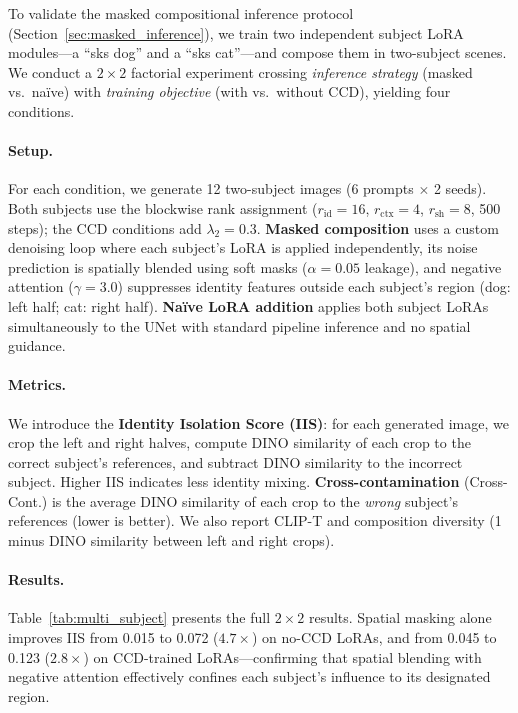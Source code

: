 \documentclass{article}
\begin{document}
To validate the masked compositional inference protocol (Section~\ref{sec:masked_inference}), we train two independent subject LoRA modules---a ``sks dog'' and a ``sks cat''---and compose them in two-subject scenes.
We conduct a $2 \times 2$ factorial experiment crossing \emph{inference strategy} (masked vs.\ na\"ive) with \emph{training objective} (with vs.\ without CCD), yielding four conditions.

\paragraph{Setup.}
For each condition, we generate 12 two-subject images (6 prompts $\times$ 2 seeds).
Both subjects use the blockwise rank assignment ($r_{\text{id}}{=}16$, $r_{\text{ctx}}{=}4$, $r_{\text{sh}}{=}8$, 500 steps); the CCD conditions add $\lambda_2{=}0.3$.
\textbf{Masked composition} uses a custom denoising loop where each subject's LoRA is applied independently, its noise prediction is spatially blended using soft masks ($\alpha{=}0.05$ leakage), and negative attention ($\gamma{=}3.0$) suppresses identity features outside each subject's region (dog: left half; cat: right half).
\textbf{Na\"ive LoRA addition} applies both subject LoRAs simultaneously to the UNet with standard pipeline inference and no spatial guidance.

\paragraph{Metrics.}
We introduce the \textbf{Identity Isolation Score (IIS)}: for each generated image, we crop the left and right halves, compute DINO similarity of each crop to the correct subject's references, and subtract DINO similarity to the incorrect subject.
Higher IIS indicates less identity mixing.
\textbf{Cross-contamination} (Cross-Cont.) is the average DINO similarity of each crop to the \emph{wrong} subject's references (lower is better).
We also report CLIP-T and composition diversity (1 minus DINO similarity between left and right crops).

\paragraph{Results.}
Table~\ref{tab:multi_subject} presents the full $2 \times 2$ results.
Spatial masking alone improves IIS from 0.015 to 0.072 ($4.7\times$) on no-CCD LoRAs, and from 0.045 to 0.123 ($2.8\times$) on CCD-trained LoRAs---confirming that spatial blending with negative attention effectively confines each subject's influence to its designated region.
\end{document}
